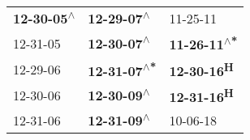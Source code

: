 \begin{supertabular}{lll}
 \textbf{12-30-05\textsuperscript{$\wedge$}} &   \textbf{12-29-07\textsuperscript{$\wedge$}} &                    11-25-11\textsuperscript{} \\
                  12-31-05\textsuperscript{} &   \textbf{12-30-07\textsuperscript{$\wedge$}} &  \textbf{11-26-11\textsuperscript{$\wedge$*}} \\
                  12-29-06\textsuperscript{} &  \textbf{12-31-07\textsuperscript{$\wedge$*}} &          \textbf{12-30-16\textsuperscript{H}} \\
                  12-30-06\textsuperscript{} &   \textbf{12-30-09\textsuperscript{$\wedge$}} &          \textbf{12-31-16\textsuperscript{H}} \\
                  12-31-06\textsuperscript{} &   \textbf{12-31-09\textsuperscript{$\wedge$}} &                    10-06-18\textsuperscript{} \\
\end{supertabular}
